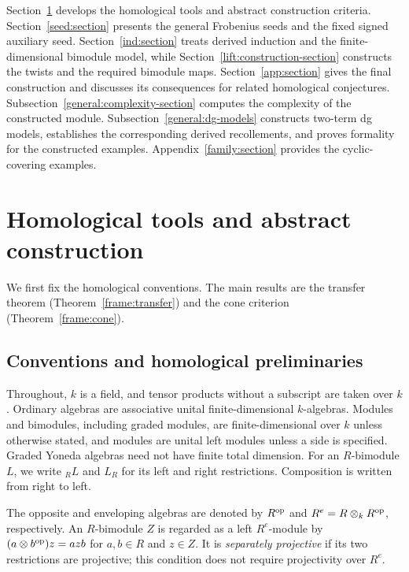 \documentclass[11pt]{article}
\begin{document}
Section~\ref{prelim:section} develops the homological tools and abstract
construction criteria. Section~\ref{seed:section} presents the general
Frobenius seeds and the fixed signed auxiliary seed.
Section~\ref{ind:section} treats derived induction and the
finite-dimensional bimodule model, while
Section~\ref{lift:construction-section} constructs the twists and the
required bimodule maps. Section~\ref{app:section} gives the final
construction and discusses its consequences for related homological
conjectures. Subsection~\ref{general:complexity-section} computes the
complexity of the constructed module. Subsection~\ref{general:dg-models}
constructs two-term dg models, establishes the corresponding derived
recollements, and proves formality for the constructed examples.
Appendix~\ref{family:section} provides the cyclic-covering examples.

\section{Homological tools and abstract construction} \label{prelim:section}

We first fix the homological conventions. The main results are the
transfer theorem (Theorem~\ref{frame:transfer}) and the cone criterion
(Theorem~\ref{frame:cone}).

\subsection{Conventions and homological preliminaries}\label{prelim:notation}


Throughout, $k$ is a field, and tensor products without a subscript
are taken over $k$. Ordinary algebras are associative unital finite-dimensional
$k$-algebras. Modules and bimodules, including graded modules, are
finite-dimensional over $k$ unless otherwise stated, and modules
are unital left modules unless a side is specified. Graded
Yoneda algebras need not have finite total dimension. For an $R$-bimodule $L$,
we write $ {}_RL$ and $L_R$ for its left and right restrictions.
Composition is written from right to left.

The opposite and enveloping algebras are denoted by $R^{\rm op}$ and
$R^e=R\otimes_kR^{\rm op}$, respectively. An $R$-bimodule $Z$ is regarded
as a left $R^e$-module by $(a\otimes b^{\rm op})z=azb$ for $a,b\in R$ and $z\in Z$.
It is \emph{separately projective} if its two restrictions are projective; this condition does
not require projectivity over $R^e$.
\end{document}
